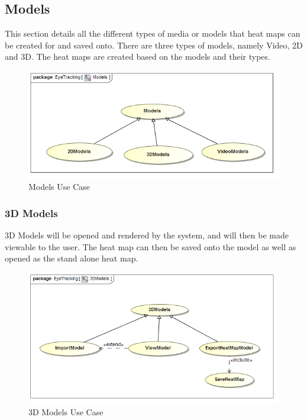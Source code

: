 \subsection{Models}
This section details all the different types of media or models that heat maps can be created for and saved onto. There are three types of models, namely Video, 2D and 3D. The heat maps are created based on the models and their types.
\newline
\begin{figure}[!ht]
	\centering	
	\includegraphics[scale=0.5]{Diagrams/Use_Case_Diagram__Models.png}
	\caption{Models Use Case}
\end{figure}
	
	\subsubsection{3D Models}
	3D Models will be opened and rendered by the system, and will then be made viewable to the user. The heat map can then be saved onto the model as well as opened as the stand alone heat map.
	\newline
	\begin{figure}[!ht]
		\centering
		\includegraphics[scale=0.5]{Diagrams/Use_Case_Diagram__3DModels.png}
		\caption{3D Models Use Case}
	\end{figure}
	
